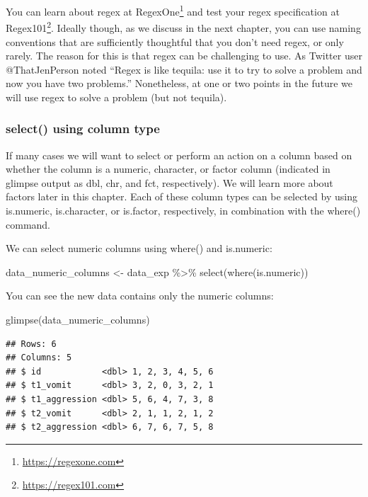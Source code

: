 \documentclass[
]{krantz}
\makeatletter
\newenvironment{Shaded}{\begin{snugshade}}{\end{snugshade}}
\newcommand{\FunctionTok}[1]{\textcolor[rgb]{0,0,0}{#1}}
\newcommand{\NormalTok}[1]{#1}
\newcommand{\OtherTok}[1]{\textcolor[rgb]{0.37,0.37,0.37}{#1}}
\newcommand{\SpecialCharTok}[1]{\textcolor[rgb]{0,0,0}{#1}}
\renewcommand{\href}[2]{#2\footnote{\url{#1}}}
\newenvironment{kframe}{%
\medskip{}
\setlength{\fboxsep}{.8em}
 \def\at@end@of@kframe{}%
 \ifinner\ifhmode%
  \def\at@end@of@kframe{\end{minipage}}%
  \begin{minipage}{\columnwidth}%
 \fi\fi%
 \def\FrameCommand##1{\hskip\@totalleftmargin \hskip-\fboxsep
 \colorbox{shadecolor}{##1}\hskip-\fboxsep
     \hskip-\linewidth \hskip-\@totalleftmargin \hskip\columnwidth}%
 \MakeFramed {\advance\hsize-\width
   \@totalleftmargin\z@ \linewidth\hsize
   \@setminipage}}%
 {\par\unskip\endMakeFramed%
 \at@end@of@kframe}
\renewenvironment{Shaded}{\begin{kframe}}{\end{kframe}}
\makeatother
\begin{document}
You can learn about regex at \href{https://regexone.com}{RegexOne} and test your regex specification at \href{https://regex101.com}{Regex101}. Ideally though, as we discuss in the next chapter, you can use naming conventions that are sufficiently thoughtful that you don't need regex, or only rarely. The reason for this is that regex can be challenging to use. As Twitter user @ThatJenPerson noted ``Regex is like tequila: use it to try to solve a problem and now you have two problems.'' Nonetheless, at one or two points in the future we will use regex to solve a problem (but not tequila).

\hypertarget{select-using-column-type}{%
\subsubsection{select() using column type}\label{select-using-column-type}}

If many cases we will want to select or perform an action on a column based on whether the column is a numeric, character, or factor column (indicated in glimpse output as dbl, chr, and fct, respectively). We will learn more about factors later in this chapter. Each of these column types can be selected by using is.numeric, is.character, or is.factor, respectively, in combination with the where() command.

We can select numeric columns using where() and is.numeric:

\begin{Shaded}
\begin{Highlighting}[]
\NormalTok{data\_numeric\_columns }\OtherTok{\textless{}{-}}\NormalTok{ data\_exp }\SpecialCharTok{\%\textgreater{}\%} 
  \FunctionTok{select}\NormalTok{(}\FunctionTok{where}\NormalTok{(is.numeric))}
\end{Highlighting}
\end{Shaded}

You can see the new data contains only the numeric columns:

\begin{Shaded}
\begin{Highlighting}[]
\FunctionTok{glimpse}\NormalTok{(data\_numeric\_columns)}
\end{Highlighting}
\end{Shaded}

\begin{verbatim}
## Rows: 6
## Columns: 5
## $ id            <dbl> 1, 2, 3, 4, 5, 6
## $ t1_vomit      <dbl> 3, 2, 0, 3, 2, 1
## $ t1_aggression <dbl> 5, 6, 4, 7, 3, 8
## $ t2_vomit      <dbl> 2, 1, 1, 2, 1, 2
## $ t2_aggression <dbl> 6, 7, 6, 7, 5, 8
\end{verbatim}
\end{document}
